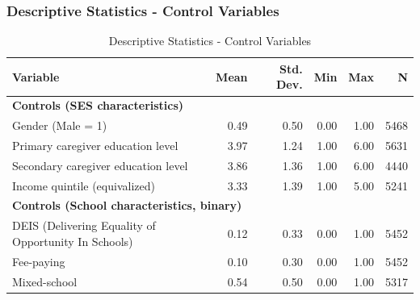 \documentclass{beamer}
\begin{document}
\begin{frame}
\frametitle{Descriptive Statistics - Control Variables}
\hypertarget{ControlVariables}{}
\tiny
\begin{table}
\centering
\caption{Descriptive Statistics - Control Variables}
\label{tab:control_desc_stats}
\begin{tabular}{lrrrrr}
\toprule
Variable & Mean & Std. Dev. & Min & Max & N \\
\midrule
\multicolumn{6}{l}{\textbf{Controls (SES characteristics)}} \\
Gender (Male = 1) & 0.49 & 0.50 & 0.00 & 1.00 & 5468 \\
Primary caregiver education level & 3.97 & 1.24 & 1.00 & 6.00 & 5631 \\
Secondary caregiver education level & 3.86 & 1.36 & 1.00 & 6.00 & 4440 \\
Income quintile (equivalized) & 3.33 & 1.39 & 1.00 & 5.00 & 5241 \\
\midrule
\multicolumn{6}{l}{\textbf{Controls (School characteristics, binary)}} \\
DEIS (Delivering Equality of Opportunity In Schools) & 0.12 & 0.33 & 0.00 & 1.00 & 5452 \\
Fee-paying & 0.10 & 0.30 & 0.00 & 1.00 & 5452 \\
Mixed-school & 0.54 & 0.50 & 0.00 & 1.00 & 5317 \\
\bottomrule
\end{tabular}
\end{table}
\vfill
\hfill
\hyperlink{Timeline}{}
\end{frame}
\end{document}
